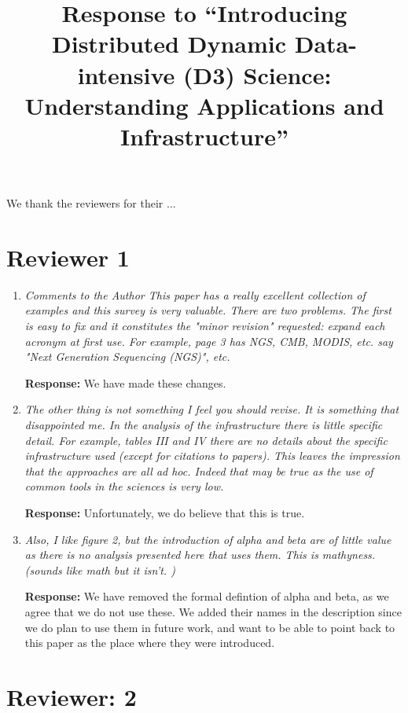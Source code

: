 \documentclass{article}
\begin{document}
\title{Response to ``Introducing Distributed Dynamic Data-intensive (D3) Science: Understanding Applications and Infrastructure''}
\maketitle

We thank the reviewers for their ...

\section{Reviewer 1}

\begin{enumerate}
\item \emph{Comments to the Author This paper has a really excellent collection of examples and this survey is very valuable. There are two problems. The first is easy to fix and it constitutes the "minor revision" requested: expand each acronym at first use. For example, page 3 has NGS, CMB, MODIS, etc. say "Next Generation Sequencing (NGS)", etc.}

\textbf{Response:} We have made these changes.


\item \emph{The other thing is not something I feel you should revise. It is something that disappointed me. In the analysis of the infrastructure there is little specific detail. For example, tables III and IV there are no details about the specific infrastructure used (except for citations to papers). This leaves the impression that the approaches are all ad hoc. Indeed that may be true as the use of common tools in the sciences is very low.}

\textbf{Response:} Unfortunately, we do believe that this is true.

\item \emph{Also, I like figure 2, but the introduction of alpha and beta are of little value as there is no analysis presented here that uses them. This is mathyness. (sounds like math but it isn't. )}

\textbf{Response:} We have removed the formal defintion of alpha and beta, as we agree that we do not use these.  We added their names in the description since we do plan to use them in future work, and want to be able to point back to this paper as the place where they were introduced.
\end{enumerate}

\section{Reviewer: 2}
\end{document}
